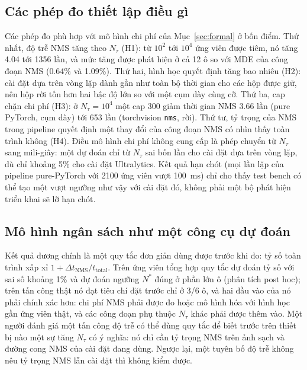 \documentclass[a4paper,fleqn]{cas-dc}
\newcommand{\Ntau}{N_{\tau}}
\begin{document}
\subsection{Các phép đo thiết lập điều gì}
Các phép đo phù hợp với mô hình chi phí của Mục~\ref{sec:formal} ở bốn điểm. Thứ nhất, độ trễ NMS tăng theo $\Ntau$ (H1): từ $10^2$ tới $10^4$ ứng viên được tiêm, nó tăng 4.04 tới 1356 lần, và mức tăng được phát hiện ở cả 12 ô so với MDE của công đoạn NMS (0.64\% và 1.09\%). Thứ hai, hình học quyết định tăng bao nhiêu (H2): cài đặt dựa trên vòng lặp dành gần như toàn bộ thời gian cho các hộp được giữ, nên hộp rời tốn hơn hai bậc độ lớn so với một cụm dày cùng cỡ. Thứ ba, cap chặn chi phí (H3): ở $\Ntau=10^4$ một cap 300 giảm thời gian NMS 3.66 lần (pure PyTorch, cụm dày) tới 653 lần (torchvision \texttt{nms}, rời). Thứ tư, tỷ trọng của NMS trong pipeline quyết định một thay đổi của công đoạn NMS có nhìn thấy toàn trình không (H4). Điều mô hình chi phí không cung cấp là phép chuyển từ $\Ntau$ sang mili-giây: một dự đoán chỉ từ $\Ntau$ sai bốn lần cho cài đặt dựa trên vòng lặp, dù chỉ khoảng 5\% cho cài đặt Ultralytics. Kết quả hạn chót (mọi lần lặp của pipeline pure-PyTorch với 2100 ứng viên vượt 100~ms) chỉ cho thấy test bench có thể tạo một vượt ngưỡng như vậy với cài đặt đó, không phải một bộ phát hiện triển khai sẽ lỡ hạn chót.

\subsection{Mô hình ngân sách như một công cụ dự đoán}
Kết quả dương chính là một quy tắc đơn giản dùng được trước khi đo: tỷ số toàn trình xấp xỉ $1 + \Delta t_{\mathrm{NMS}}/t_{\mathrm{total}}$. Trên ứng viên tổng hợp quy tắc dự đoán tỷ số với sai số khoảng 1\% và dự đoán ngưỡng $N^{*}$ đúng ở phần lớn ô (phân tích post hoc); trên tấn công thật nó đạt tiêu chí đặt trước chỉ ở 3/6 ô, và hai đầu vào của nó phải chính xác hơn: chi phí NMS phải được đo hoặc mô hình hóa với hình học gần ứng viên thật, và các công đoạn phụ thuộc $\Ntau$ khác phải được thêm vào. Một người đánh giá một tấn công độ trễ có thể dùng quy tắc để biết trước trên thiết bị nào một sự tăng $\Ntau$ có ý nghĩa: nó chỉ cần tỷ trọng NMS trên ảnh sạch và đường cong NMS của cài đặt đang dùng. Ngược lại, một tuyên bố độ trễ không nêu tỷ trọng NMS lẫn cài đặt thì không kiểm được.
\end{document}
